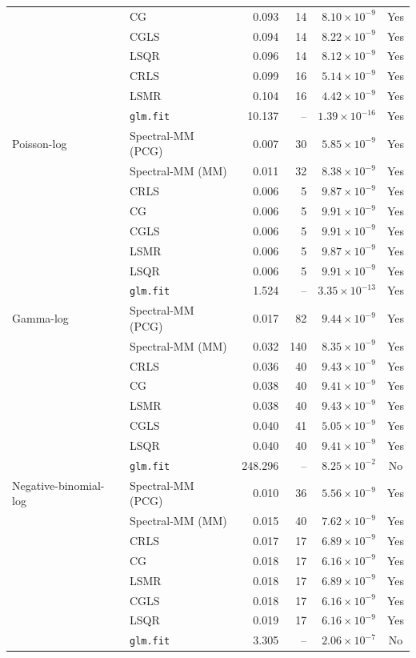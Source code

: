 \documentclass[10pt,a4paper]{article}
\begin{document}
\begin{longtable}{llrrrc}
 & CG & 0.093 & 14 & $8.10\times10^{-9}$ & Yes \\
 & CGLS & 0.094 & 14 & $8.22\times10^{-9}$ & Yes \\
 & LSQR & 0.096 & 14 & $8.12\times10^{-9}$ & Yes \\
 & CRLS & 0.099 & 16 & $5.14\times10^{-9}$ & Yes \\
 & LSMR & 0.104 & 16 & $4.42\times10^{-9}$ & Yes \\
 & \texttt{glm.fit} & 10.137 & -- & $1.39\times10^{-16}$ & Yes \\
\midrule
Poisson-log & Spectral-MM (PCG) & 0.007 & 30 & $5.85\times10^{-9}$ & Yes \\
 & Spectral-MM (MM) & 0.011 & 32 & $8.38\times10^{-9}$ & Yes \\
 & CRLS & 0.006 & 5 & $9.87\times10^{-9}$ & Yes \\
 & CG & 0.006 & 5 & $9.91\times10^{-9}$ & Yes \\
 & CGLS & 0.006 & 5 & $9.91\times10^{-9}$ & Yes \\
 & LSMR & 0.006 & 5 & $9.87\times10^{-9}$ & Yes \\
 & LSQR & 0.006 & 5 & $9.91\times10^{-9}$ & Yes \\
 & \texttt{glm.fit} & 1.524 & -- & $3.35\times10^{-13}$ & Yes \\
\midrule
Gamma-log & Spectral-MM (PCG) & 0.017 & 82 & $9.44\times10^{-9}$ & Yes \\
 & Spectral-MM (MM) & 0.032 & 140 & $8.35\times10^{-9}$ & Yes \\
 & CRLS & 0.036 & 40 & $9.43\times10^{-9}$ & Yes \\
 & CG & 0.038 & 40 & $9.41\times10^{-9}$ & Yes \\
 & LSMR & 0.038 & 40 & $9.43\times10^{-9}$ & Yes \\
 & CGLS & 0.040 & 41 & $5.05\times10^{-9}$ & Yes \\
 & LSQR & 0.040 & 40 & $9.41\times10^{-9}$ & Yes \\
 & \texttt{glm.fit} & 248.296 & -- & $8.25\times10^{-2}$ & No \\
\midrule
Negative-binomial-log & Spectral-MM (PCG) & 0.010 & 36 & $5.56\times10^{-9}$ & Yes \\
 & Spectral-MM (MM) & 0.015 & 40 & $7.62\times10^{-9}$ & Yes \\
 & CRLS & 0.017 & 17 & $6.89\times10^{-9}$ & Yes \\
 & CG & 0.018 & 17 & $6.16\times10^{-9}$ & Yes \\
 & LSMR & 0.018 & 17 & $6.89\times10^{-9}$ & Yes \\
 & CGLS & 0.018 & 17 & $6.16\times10^{-9}$ & Yes \\
 & LSQR & 0.019 & 17 & $6.16\times10^{-9}$ & Yes \\
 & \texttt{glm.fit} & 3.305 & -- & $2.06\times10^{-7}$ & No \\
\end{longtable}
\end{document}
